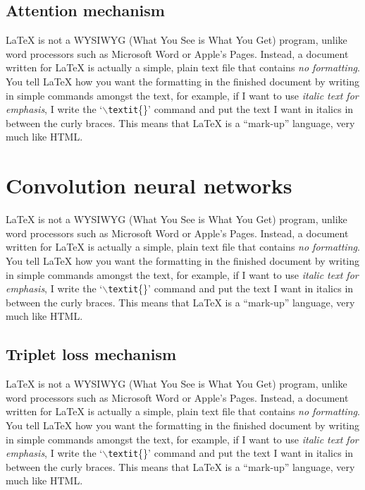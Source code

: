 \subsection{Attention mechanism}


\LaTeX{} is not a WYSIWYG (What You See is What You Get) program, unlike word processors such as Microsoft Word or Apple's Pages. Instead, a document written for \LaTeX{} is actually a simple, plain text file that contains \emph{no formatting}. You tell \LaTeX{} how you want the formatting in the finished document by writing in simple commands amongst the text, for example, if I want to use \textit{italic text for emphasis}, I write the `$\backslash$\texttt{textit}\{\}' command and put the text I want in italics in between the curly braces. This means that \LaTeX{} is a ``mark-up'' language, very much like HTML.

\section{Convolution neural networks}

\LaTeX{} is not a WYSIWYG (What You See is What You Get) program, unlike word processors such as Microsoft Word or Apple's Pages. Instead, a document written for \LaTeX{} is actually a simple, plain text file that contains \emph{no formatting}. You tell \LaTeX{} how you want the formatting in the finished document by writing in simple commands amongst the text, for example, if I want to use \textit{italic text for emphasis}, I write the `$\backslash$\texttt{textit}\{\}' command and put the text I want in italics in between the curly braces. This means that \LaTeX{} is a ``mark-up'' language, very much like HTML.

\subsection{Triplet loss mechanism}


\LaTeX{} is not a WYSIWYG (What You See is What You Get) program, unlike word processors such as Microsoft Word or Apple's Pages. Instead, a document written for \LaTeX{} is actually a simple, plain text file that contains \emph{no formatting}. You tell \LaTeX{} how you want the formatting in the finished document by writing in simple commands amongst the text, for example, if I want to use \textit{italic text for emphasis}, I write the `$\backslash$\texttt{textit}\{\}' command and put the text I want in italics in between the curly braces. This means that \LaTeX{} is a ``mark-up'' language, very much like HTML.

